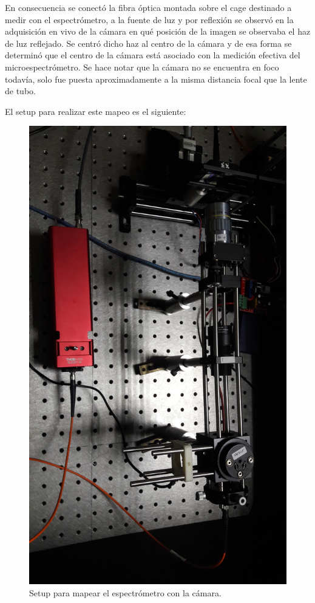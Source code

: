 En consecuencia se conectó la fibra óptica montada sobre el cage destinado a medir con el espectrómetro, a la fuente de luz y por reflexión se observó en la adquisición en vivo de la cámara en qué posición de la imagen se observaba el haz de luz reflejado. Se centró dicho haz al centro de la cámara y de esa forma se determinó que el centro de la cámara está asociado con la medición efectiva del microespectrómetro. Se hace notar que la cámara no se encuentra en foco todavía, solo fue puesta aproximadamente a la misma distancia focal que la lente de tubo.

El setup para realizar este mapeo es el siguiente:
\begin{figure}[H]
	\centering
	\includegraphics[scale=0.1]{Figs/microespectrometro/mapespeccam.jpg}
	\caption{Setup para mapear el espectrómetro con la cámara.}
	\label{fig:bgcel}
\end{figure}


